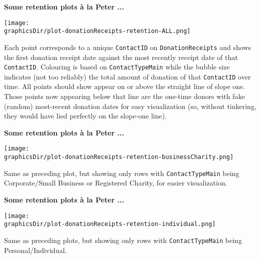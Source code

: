 \begin{frame}{\bf Some retention plots \`{a} la Peter ...}
\tiny

\vskip 0.4cm

\begin{center}
\texttt{[image: \\graphicsDir/plot-donationReceipts-retention-ALL.png]}
\end{center}

\begin{flushleft}
\vskip -0.2cm
Each point corresponds to a unique \texttt{ContactID} on \texttt{DonationReceipts} and
shows the first donation receipt date against the most recently receipt date of that \texttt{ContactID}.
Colouring is based on \texttt{ContactTypeMain} while the bubble size indicates (not too reliably)
the total amount of donation of that \texttt{ContactID} over time.
All points should show appear on or above the straight line of slope one.
Those points now appearing below that line are the one-time donors with fake (random)
most-recent donation dates for easy visualization
(so, without tinkering, they would have lied perfectly on the slope-one line).
\end{flushleft}

\end{frame}

\begin{frame}{\bf Some retention plots \`{a} la Peter ...}
\tiny

\vskip 0.4cm

\begin{center}
\texttt{[image: \\graphicsDir/plot-donationReceipts-retention-businessCharity.png]}
\end{center}

\begin{flushleft}
\vskip -0.2cm
Same as preceding plot, but showing only rows with \texttt{ContactTypeMain} being Corporate/Small Business
or Registered Charity, for easier visualization.
\end{flushleft}

\end{frame}

\begin{frame}{\bf Some retention plots \`{a} la Peter ...}
\tiny

\vskip 0.4cm

\begin{center}
\texttt{[image: \\graphicsDir/plot-donationReceipts-retention-individual.png]}
\end{center}

\begin{flushleft}
\vskip -0.2cm
Same as preceding plots, but showing only rows with \texttt{ContactTypeMain} being Personal/Individual.
\end{flushleft}

\end{frame}

